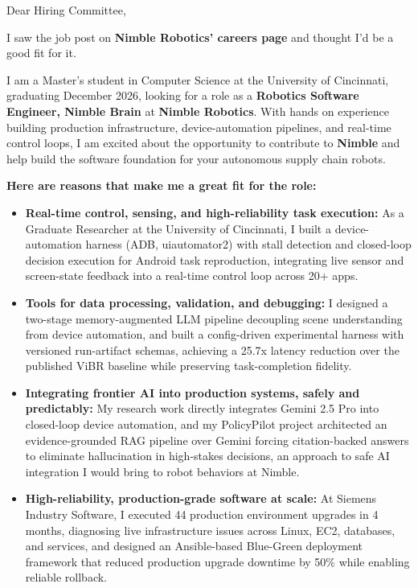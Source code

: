 \documentclass[11pt]{letter}
\date{}
\begin{document}
\begin{letter}{}

\opening{Dear Hiring Committee,}

I saw the job post on \textbf{Nimble Robotics' careers page} and thought I'd be a good fit for it.

I am a Master's student in Computer Science at the University of Cincinnati, graduating December 2026, looking for a role as a \textbf{Robotics Software Engineer, Nimble Brain} at \textbf{Nimble Robotics}. With hands on experience building production infrastructure, device-automation pipelines, and real-time control loops, I am excited about the opportunity to contribute to \textbf{Nimble} and help build the software foundation for your autonomous supply chain robots.

\textbf{Here are reasons that make me a great fit for the role:}

\begin{itemize}[leftmargin=*, itemsep=0.45em]
    \item \textbf{Real-time control, sensing, and high-reliability task execution:} As a Graduate Researcher at the University of Cincinnati, I built a device-automation harness (ADB, uiautomator2) with stall detection and closed-loop decision execution for Android task reproduction, integrating live sensor and screen-state feedback into a real-time control loop across 20+ apps.

    \item \textbf{Tools for data processing, validation, and debugging:} I designed a two-stage memory-augmented LLM pipeline decoupling scene understanding from device automation, and built a config-driven experimental harness with versioned run-artifact schemas, achieving a 25.7x latency reduction over the published ViBR baseline while preserving task-completion fidelity.

    \item \textbf{Integrating frontier AI into production systems, safely and predictably:} My research work directly integrates Gemini 2.5 Pro into closed-loop device automation, and my PolicyPilot project architected an evidence-grounded RAG pipeline over Gemini forcing citation-backed answers to eliminate hallucination in high-stakes decisions, an approach to safe AI integration I would bring to robot behaviors at Nimble.

    \item \textbf{High-reliability, production-grade software at scale:} At Siemens Industry Software, I executed 44 production environment upgrades in 4 months, diagnosing live infrastructure issues across Linux, EC2, databases, and services, and designed an Ansible-based Blue-Green deployment framework that reduced production upgrade downtime by 50\% while enabling reliable rollback.


\end{itemize}
\end{letter}
\end{document}
